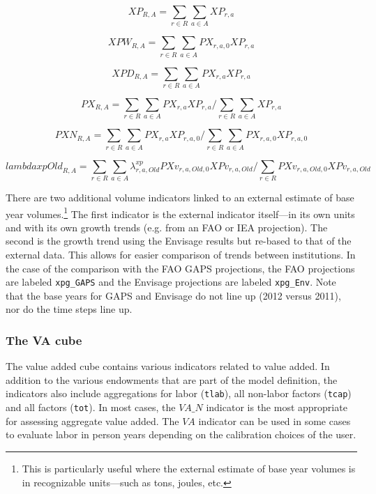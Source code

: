 \[
\mathit{XP}_{R,A} =
\sum_{r \in R} {\sum_{a \in A} {\mathit{XP}_{r,a}}}
\]

\[
\mathit{XPW}_{R,A} =
\sum_{r \in R} {\sum_{a \in A} {\mathit{PX}_{r,a,0}\mathit{XP}_{r,a}}}
\]

\[
\mathit{XPD}_{R,A} =
\sum_{r \in R} {\sum_{a \in A} {\mathit{PX}_{r,a}\mathit{XP}_{r,a}}}
\]

\[
\mathit{PX}_{R,A} =
\sum_{r \in R} {\sum_{a \in A} {\mathit{PX}_{r,a}\mathit{XP}_{r,a}}}
\bigg/
\sum_{r \in R} {\sum_{a \in A} {\mathit{XP}_{r,a}}}
\]

\[
\mathit{PXN}_{R,A} =
\sum_{r \in R} {\sum_{a \in A} {\mathit{PX}_{r,a}\mathit{XP}_{r,a,0}}}
\bigg/
\sum_{r \in R} {\sum_{a \in A} {\mathit{PX}_{r,a,0} \mathit{XP}_{r,a,0}}}
\]

\[
\mathit{lambdaxpOld}_{R,A} =
\sum_{r \in R} {\sum_{a \in A}
{\lambda^{\mathit{xp}}_{r, a, \mathit{Old}} \mathit{PXv}_{r,a, \mathit{Old},0}\mathit{XPv}_{r,a, \mathit{Old}}}}
\bigg/
\sum_{r \in R} {\mathit{PXv}_{r,a, \mathit{Old},0}\mathit{XPv}_{r,a, \mathit{Old}}}
\]

\noindent [Optional] There are two additional volume indicators linked
to an external estimate of base year volumes.\footnote{This is particularly
useful where the external estimate of base year volumes is in recognizable
units---such as tons, joules, etc.} The first indicator is the external
indicator itself---in its own units and with its own growth trends (e.g. from
an FAO or IEA projection). The second is the growth trend using the Envisage
results but re-based to that of the external data. This allows for easier
comparison of trends between institutions. In the case of the comparison
with the FAO GAPS projections, the FAO projections are labeled \texttt{xpg\_GAPS}
and the Envisage projections are labeled \texttt{xpg\_Env}. Note that the base
years for GAPS and Envisage do not line up (2012 versus 2011), nor do the time
steps line up.

\subsubsection{The VA cube}
The value added cube contains various indicators related to value added. In addition
to the various endowments that are part of the model definition, the indicators
also include aggregations for labor (\texttt{tlab}), all non-labor factors (\texttt{tcap}) and all factors (\texttt{tot}). In most cases, the
$\mathit{VA\_N}$ indicator is the most appropriate for assessing
aggregate value added. The $\mathit{VA}$ indicator can be
used in some cases to evaluate labor in person years
depending on the calibration choices of the user.

